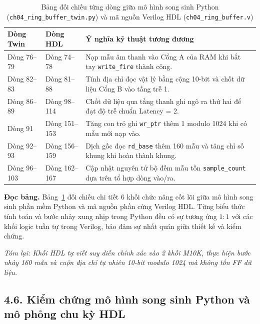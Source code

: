 \begin{table}[t]
\centering
\caption{Bảng đối chiếu từng dòng giữa mô hình song sinh Python (\texttt{ch04\_ring\_buffer\_twin.py}) và mã nguồn Verilog HDL (\texttt{ch04\_ring\_buffer.v})}
\label{tab:ch04_twin_vs_hdl}
\begin{tabularx}{\textwidth}{p{2.5cm}p{2.5cm}X}
\toprule
\textbf{Dòng Twin} & \textbf{Dòng HDL} & \textbf{Ý nghĩa kỹ thuật tương đương} \\
\midrule
Dòng 76--79 & Dòng 74--78 & Nạp mẫu âm thanh vào Cổng A của RAM khi bắt tay \texttt{write\_fire} thành công. \\
Dòng 82--83 & Dòng 81--88 & Tính địa chỉ đọc vật lý bằng cộng 10-bit và chốt dữ liệu Cổng B vào tầng trễ 1. \\
Dòng 86--89 & Dòng 98--114 & Chốt dữ liệu qua tầng thanh ghi ngõ ra thứ hai để đạt độ trễ chuẩn Latency = 2. \\
Dòng 91 & Dòng 151--153 & Tăng con trỏ ghi \texttt{wr\_ptr} thêm 1 modulo 1024 khi có mẫu mới nạp vào. \\
Dòng 92--93 & Dòng 156--159 & Dịch gốc đọc \texttt{rd\_base} thêm 160 mẫu và tăng chỉ số khung khi hoàn thành khung. \\
Dòng 96--103 & Dòng 162--167 & Cập nhật nguyên tử bộ đếm mẫu tồn \texttt{sample\_count} dựa trên tổ hợp dòng vào/ra. \\
\bottomrule
\end{tabularx}
\end{table}

\textbf{Đọc bảng.} Bảng~\ref{tab:ch04_twin_vs_hdl} đối chiếu chi tiết 6 khối chức năng cốt lõi giữa mô hình song sinh phần mềm Python và mã nguồn phần cứng Verilog HDL. Từng biểu thức tính toán và bước nhảy xung nhịp trong Python đều có sự tương ứng $1:1$ với các khối logic tuần tự trong Verilog, bảo đảm sự nhất quán giữa thiết kế và kiểm chứng.

\textit{Tóm lại: Khối HDL tự viết suy diễn chính xác vào 2 khối M10K, thực hiện bước nhảy 160 mẫu và cuộn địa chỉ tự nhiên 10-bit modulo 1024 mà không tốn FF dữ liệu.}

\subsection*{4.6. Kiểm chứng mô hình song sinh Python và mô phỏng chu kỳ HDL}

